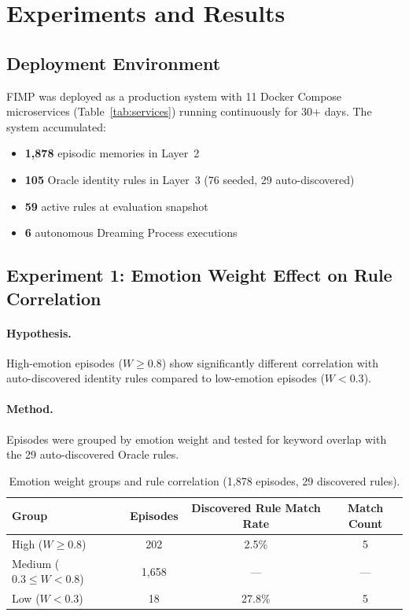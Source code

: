 \documentclass[11pt,a4paper]{article}
\begin{document}
\section{Experiments and Results}
\label{sec:experiments}

\subsection{Deployment Environment}

FIMP was deployed as a production system with 11 Docker Compose microservices (Table~\ref{tab:services}) running continuously for 30+ days. The system accumulated:
\begin{itemize}[itemsep=2pt]
  \item \textbf{1,878} episodic memories in Layer~2
  \item \textbf{105} Oracle identity rules in Layer~3 (76 seeded, 29 auto-discovered)
  \item \textbf{59} active rules at evaluation snapshot
  \item \textbf{6} autonomous Dreaming Process executions
\end{itemize}

\subsection{Experiment 1: Emotion Weight Effect on Rule Correlation}

\paragraph{Hypothesis.} High-emotion episodes ($W \geq 0.8$) show significantly different correlation with auto-discovered identity rules compared to low-emotion episodes ($W < 0.3$).

\paragraph{Method.} Episodes were grouped by emotion weight and tested for keyword overlap with the 29 auto-discovered Oracle rules.

\begin{table}[h]
\centering
\caption{Emotion weight groups and rule correlation (1,878 episodes, 29 discovered rules).}
\label{tab:exp1}
\small
\begin{tabular}{@{}lccc@{}}
\toprule
\textbf{Group} & \textbf{Episodes} & \textbf{Discovered Rule Match Rate} & \textbf{Match Count} \\
\midrule
High ($W \geq 0.8$) & 202 & 2.5\% & 5 \\
Medium ($0.3 \leq W < 0.8$) & 1,658 & --- & --- \\
Low ($W < 0.3$) & 18 & 27.8\% & 5 \\
\bottomrule
\end{tabular}
\end{table}
\end{document}
